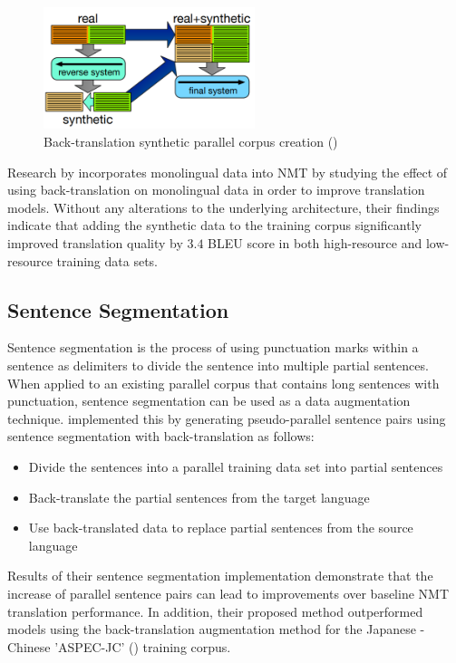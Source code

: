 \begin{figure}[ht!]
\centering
\includegraphics[width=0.55\textwidth]{media/literature/data_argumentation/da_back_trans.png}
\caption[Back-translation synthetic parallel corpus creation]{Back-translation synthetic parallel corpus creation (\cite{hoang_iterative_2018})}
\label{fig:back_trans}
\end{figure}
Research by \cite{sennrich_improving_2016} incorporates monolingual data into \acrshort{NMT} by studying the effect of using back-translation on monolingual data in order to improve translation models.  Without any alterations to the underlying architecture, their findings indicate that adding the synthetic data to the training corpus significantly improved translation quality by $3.4$ BLEU score in both high-resource and low-resource training data sets.


\subsection{Sentence Segmentation}

Sentence segmentation is the process of using punctuation marks within a sentence as delimiters to divide the sentence into multiple partial sentences. When applied to an existing parallel corpus that contains long sentences with punctuation, sentence segmentation can be used as a data augmentation technique. \cite{zhang_corpus_2019} implemented this by generating pseudo-parallel sentence pairs using sentence segmentation with back-translation as follows:
\begin{itemize}
    \item Divide the sentences into a parallel training data set into partial sentences
    \item Back-translate the partial sentences from the target language
    \item Use back-translated data to replace partial sentences from the source language
\end{itemize}

Results of their sentence segmentation implementation demonstrate that the increase of parallel sentence pairs can lead to improvements over baseline \acrshort{NMT} translation performance. In addition, their proposed method outperformed models using the back-translation augmentation method for the Japanese - Chinese 'ASPEC-JC' (\cite{NAKAZAWA16.621}) training corpus.

